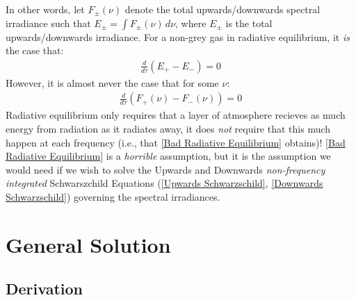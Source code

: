 In other words, let $F_\pm(\nu)$ denote the total upwards/downwards spectral irradiance such that $E_\pm=\int F_\pm(\nu)\,d\nu$, where $E_\pm$ is the total upwards/downwards irradiance. For a non-grey gas in radiative equilibrium, it \textit{is} the case that:
\begin{align*}
    \frac{d}{d\tau}(E_+-E_-)=0
\end{align*}
However, it is almost never the case that for some $\nu$:
\begin{align}\label{Bad Radiative Equilibrium}
    \frac{d}{d\tau}(F_{+}(\nu)-F_-(\nu))=0
\end{align}
Radiative equilibrium only requires that a layer of atmosphere recieves as much energy from radiation as it radiates away, it does \textit{not} require that this much happen at each frequency (i.e., that \ref{Bad Radiative Equilibrium} obtains)! \ref{Bad Radiative Equilibrium} is a \textit{horrible} assumption, but it is the assumption we would need if we wish to solve the Upwards and Downwards \textit{non-frequency integrated} Schwarszchild Equations (\ref{Upwards Schwarzschild}, \ref{Downwards Schwarzschild}) governing the spectral irradiances.

\section{General Solution}

\subsection{Derivation}

